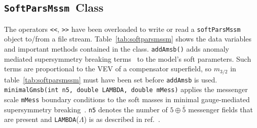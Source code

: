 \documentclass[]{article}
\def\code#1{\small{\tt #1}\normalsize}
\begin{document}
\subsection{\code{SoftParsMssm}~Class\label{sec:softie}}
The operators \code{<<}, \code{>>} have been overloaded to write or read a
\code{softParsMssm} object to/from a file stream. 
Table~\ref{tab:softparsmssm} shows
the data variables and important methods contained in the class.
\code{addAmsb()} adds anomaly mediated supersymmetry breaking
terms~\cite{Randall:1998uk} to 
the model's soft parameters. Such terms are proportional to the VEV of a
compensator superfield, so $m_{3/2}$ in table~\ref{tab:softparsmssm} must have
been set before \code{addAmsb} is used. 
\code{minimalGmsb(int n5, double LAMBDA, double mMess)} applies the messenger
scale \code{mMess} boundary conditions to the soft masses in minimal
gauge-mediated supersymmetry breaking~\cite{gmsb}. \code{n5} denotes the
number of $5\oplus \bar 5$ messenger fields that are present and
\code{LAMBDA}($\Lambda$) is as described in ref.~\cite{gmsb}. 
\end{document}
